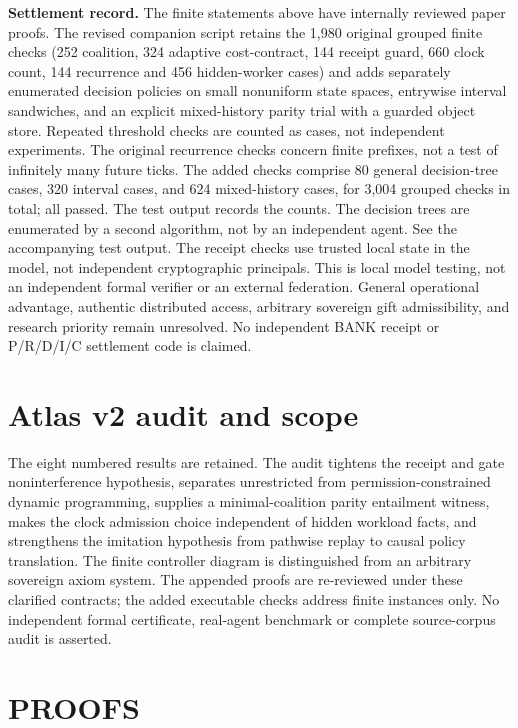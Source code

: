 \documentclass[11pt,letterpaper]{article}
\begin{document}
\textbf{Settlement record.} The finite statements above have internally reviewed paper proofs. The revised companion script retains the 1,980 original grouped finite checks (252 coalition, 324 adaptive cost-contract, 144 receipt guard, 660 clock count, 144 recurrence and 456 hidden-worker cases) and adds separately enumerated decision policies on small nonuniform state spaces, entrywise interval sandwiches, and an explicit mixed-history parity trial with a guarded object store. Repeated threshold checks are counted as cases, not independent experiments. The original recurrence checks concern finite prefixes, not a test of infinitely many future ticks. The added checks comprise 80 general decision-tree cases, 320 interval cases, and 624 mixed-history cases, for 3,004 grouped checks in total; all passed. The test output records the counts. The decision trees are enumerated by a second algorithm, not by an independent agent. See the accompanying test output. The receipt checks use trusted local state in the model, not independent cryptographic principals. This is local model testing, not an independent formal verifier or an external federation. General operational advantage, authentic distributed access, arbitrary sovereign gift admissibility, and research priority remain unresolved. No independent BANK receipt or P/R/D/I/C settlement code is claimed.

\section*{Atlas v2 audit and scope}
The eight numbered results are retained. The audit tightens the receipt and gate noninterference hypothesis, separates unrestricted from permission-constrained dynamic programming, supplies a minimal-coalition parity entailment witness, makes the clock admission choice independent of hidden workload facts, and strengthens the imitation hypothesis from pathwise replay to causal policy translation. The finite controller diagram is distinguished from an arbitrary sovereign axiom system. The appended proofs are re-reviewed under these clarified contracts; the added executable checks address finite instances only. No independent formal certificate, real-agent benchmark or complete source-corpus audit is asserted.

\appendix\section{PROOFS}
\end{document}
